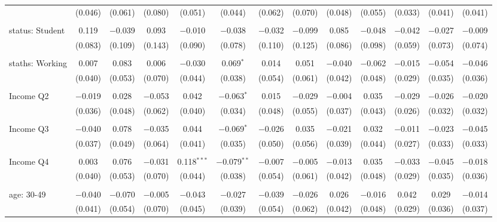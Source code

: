 \begin{tabular}{@{\extracolsep{5pt}}lcccccccccccc}
  & (0.046) & (0.061) & (0.080) & (0.051) & (0.044) & (0.062) & (0.070) & (0.048) & (0.055) & (0.033) & (0.041) & (0.041) \\ 
  & & & & & & & & & & & & \\ 
 status: Student & 0.119 & $-$0.039 & 0.093 & $-$0.010 & $-$0.038 & $-$0.032 & $-$0.099 & 0.085 & $-$0.048 & $-$0.042 & $-$0.027 & $-$0.009 \\ 
  & (0.083) & (0.109) & (0.143) & (0.090) & (0.078) & (0.110) & (0.125) & (0.086) & (0.098) & (0.059) & (0.073) & (0.074) \\ 
  & & & & & & & & & & & & \\ 
 staths: Working & 0.007 & 0.083 & 0.006 & $-$0.030 & 0.069$^{*}$ & 0.014 & 0.051 & $-$0.040 & $-$0.062 & $-$0.015 & $-$0.054 & $-$0.046 \\ 
  & (0.040) & (0.053) & (0.070) & (0.044) & (0.038) & (0.054) & (0.061) & (0.042) & (0.048) & (0.029) & (0.035) & (0.036) \\ 
  & & & & & & & & & & & & \\ 
 Income Q2 & $-$0.019 & 0.028 & $-$0.053 & 0.042 & $-$0.063$^{*}$ & 0.015 & $-$0.029 & $-$0.004 & 0.035 & $-$0.029 & $-$0.026 & $-$0.020 \\ 
  & (0.036) & (0.048) & (0.062) & (0.040) & (0.034) & (0.048) & (0.055) & (0.037) & (0.043) & (0.026) & (0.032) & (0.032) \\ 
  & & & & & & & & & & & & \\ 
 Income Q3 & $-$0.040 & 0.078 & $-$0.035 & 0.044 & $-$0.069$^{*}$ & $-$0.026 & 0.035 & $-$0.021 & 0.032 & $-$0.011 & $-$0.023 & $-$0.045 \\ 
  & (0.037) & (0.049) & (0.064) & (0.041) & (0.035) & (0.050) & (0.056) & (0.039) & (0.044) & (0.027) & (0.033) & (0.033) \\ 
  & & & & & & & & & & & & \\ 
 Income Q4 & 0.003 & 0.076 & $-$0.031 & 0.118$^{***}$ & $-$0.079$^{**}$ & $-$0.007 & $-$0.005 & $-$0.013 & 0.035 & $-$0.033 & $-$0.045 & $-$0.018 \\ 
  & (0.040) & (0.053) & (0.070) & (0.044) & (0.038) & (0.054) & (0.061) & (0.042) & (0.048) & (0.029) & (0.035) & (0.036) \\ 
  & & & & & & & & & & & & \\ 
 age: 30-49 & $-$0.040 & $-$0.070 & $-$0.005 & $-$0.043 & $-$0.027 & $-$0.039 & $-$0.026 & 0.026 & $-$0.016 & 0.042 & 0.029 & $-$0.014 \\ 
  & (0.041) & (0.054) & (0.070) & (0.045) & (0.039) & (0.054) & (0.062) & (0.042) & (0.048) & (0.029) & (0.036) & (0.037) \\ 

\end{tabular}
